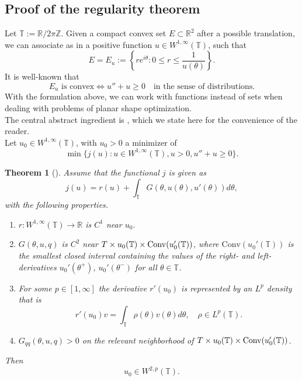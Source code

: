 \documentclass[11pt]{article}
\theoremstyle{plain}
\numberwithin{equation}{section}
\newtheorem{theorem}{Theorem}[section]
\theoremstyle{definition}
\def \R {\mathbb{R}}
\def \T{\mathbb{T}}
\def \mb{\mathbb}
\begin{document}
    \subsection{Proof of the regularity theorem}
    Let $\mb T:=\R/2\pi\mb Z$. Given a compact convex set $E\subset \R^2$ after a possible translation, we can associate as in \cite{lamboley2012regularity} a positive function $u \in W^{1,\infty}(\mb T)$, such that
    \[
    E=E_u:=\left\{re^{i\theta}: 0\leq r\leq \frac{1}{u(\theta)}\right\}.
    \]
    It is well-known that
    \[
    E_u \text{ is convex} \iff u''+u\geq 0 \quad \text{in the sense of distributions}.
    \]
    With the formulation above, we can work with functions instead of sets when dealing with problems of planar shape optimization.\\
    The central abstract ingredient is \cite[Theorem 2.4]{lamboley2012regularity}, which we state here for the convenience of the reader. \\
    Let $u_0 \in W^{1,\infty}(\T)$, with $u_0>0$ a minimizer of
    \[
    \min\{j(u): u \in W^{1,\infty}(\mb T), u>0,u''+u\geq 0\}.
    \]
    \begin{theorem}[\cite{lamboley2012regularity}]
        \label{thm:Lamboley}
        Assume that the functional $j$ is given as
        \[
        j(u)=r(u)+\int_{\mb T}G(\theta,u(\theta),u'(\theta))d\theta,
        \]
        with the following properties.
        \begin{enumerate}
            \item $r:W^{1,\infty}(\mb T)\to \R$ is $C^1$ near $u_0$.
            \item $G(\theta,u,q)$ is $C^2$ near $\mb \T \times u_0(\mb T)\times \mathrm{Conv}(u_0'(\mb T))$, where $\mathrm{Conv}(u_0'(\T))$ is the smallest closed interval containing the values of the right- and left-derivatives $u_0'(\theta^+)$, $u_0'(\theta^-)$ for all $\theta \in \mb T$.
            \item For some $p \in [1,\infty]$ the derivative $r'(u_0)$ is represented by an $L^p$ density that is
            \[
            r'(u_0)v =\int_{\mb T}\rho(\theta)v(\theta)d\theta,\quad \rho \in L^p(\mb T).
            \]
            \item $G_{qq}(\theta,u,q)>0$ on the relevant neighborhood of $\mb \T \times u_0(\mb T)\times \mathrm{Conv}(u_0'(\mb T))$.
        \end{enumerate}
        Then
        \[
        u_0\in W^{2,p}(\mb T).
        \]
    \end{theorem}
\end{document}
